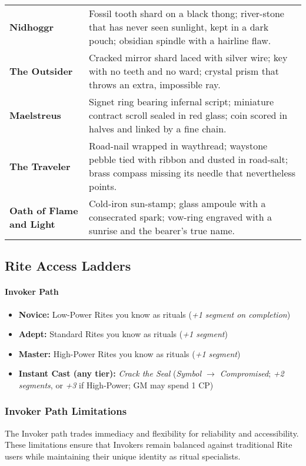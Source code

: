\documentclass[12pt,twoside]{book}
\begin{document}
\begin{table}[htbp]
\begin{tabular}{>{\bfseries}p{4.0cm} >{\raggedright\arraybackslash}p{10.8cm}}
Nidhoggr & Fossil tooth shard on a black thong; river-stone that has never seen sunlight, kept in a dark pouch; obsidian spindle with a hairline flaw. \\
The Outsider & Cracked mirror shard laced with silver wire; key with no teeth and no ward; crystal prism that throws an extra, impossible ray. \\
Maelstreus & Signet ring bearing infernal script; miniature contract scroll sealed in red glass; coin scored in halves and linked by a fine chain. \\
The Traveler & Road-nail wrapped in waythread; waystone pebble tied with ribbon and dusted in road-salt; brass compass missing its needle that nevertheless points. \\
Oath of Flame and Light & Cold-iron sun-stamp; glass ampoule with a consecrated spark; vow-ring engraved with a sunrise and the bearer’s true name. \\
\bottomrule
\end{tabular}
\end{table}

\subsection*{Rite Access Ladders}

\paragraph{Invoker Path}
\begin{itemize}
  \item \textbf{Novice:} Low-Power Rites you know as rituals (\emph{+1 segment on completion})
  \item \textbf{Adept:} Standard Rites you know as rituals (\emph{+1 segment})
  \item \textbf{Master:} High-Power Rites you know as rituals (\emph{+1 segment})
  \item \textbf{Instant Cast (any tier):} \emph{Crack the Seal} (\emph{Symbol $\rightarrow$ Compromised}; \emph{+2 segments}, or \emph{+3} if High-Power; GM may spend 1 CP)
\end{itemize}

\subsubsection{Invoker Path Limitations}

The Invoker path trades immediacy and flexibility for reliability and accessibility. These limitations ensure that Invokers remain balanced against traditional Rite users while maintaining their unique identity as ritual specialists.
\end{document}
